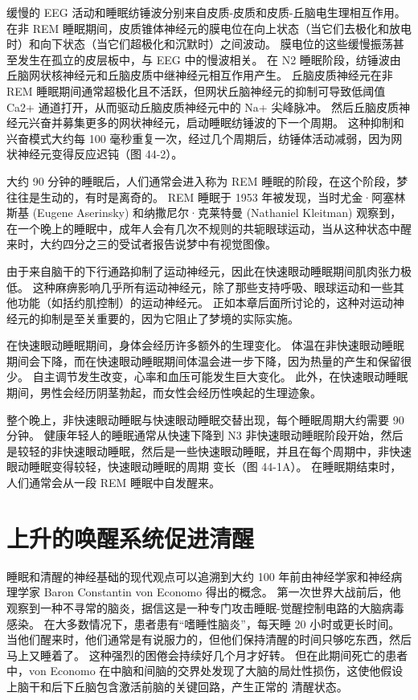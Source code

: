 缓慢的 EEG 活动和睡眠纺锤波分别来自皮质-皮质和皮质-丘脑电生理相互作用。 在非 REM 睡眠期间，皮质锥体神经元的膜电位在向上状态（当它们去极化和放电时）和向下状态（当它们超极化和沉默时）之间波动。 膜电位的这些缓慢振荡甚至发生在孤立的皮层板中，与 EEG 中的慢波相关。 在 N2 睡眠阶段，纺锤波由丘脑网状核神经元和丘脑皮质中继神经元相互作用产生。 丘脑皮质神经元在非 REM 睡眠期间通常超极化且不活跃，但网状丘脑神经元的抑制可导致低阈值 Ca2+ 通道打开，从而驱动丘脑皮质神经元中的 Na+ 尖峰脉冲。 然后丘脑皮质神经元兴奋并募集更多的网状神经元，启动睡眠纺锤波的下一个周期。 这种抑制和兴奋模式大约每 100 毫秒重复一次，经过几个周期后，纺锤体活动减弱，因为网状神经元变得反应迟钝（图 44-2）。

大约 90 分钟的睡眠后，人们通常会进入称为 REM 睡眠的阶段，在这个阶段，梦往往是生动的，有时是离奇的。 REM 睡眠于 1953 年被发现，当时尤金·阿塞林斯基 (Eugene Aserinsky) 和纳撒尼尔·克莱特曼 (Nathaniel Kleitman) 观察到，在一个晚上的睡眠中，成年人会有几次不规则的共轭眼球运动，当从这种状态中醒来时，大约四分之三的受试者报告说梦中有视觉图像。

由于来自脑干的下行通路抑制了运动神经元，因此在快速眼动睡眠期间肌肉张力极低。 这种麻痹影响几乎所有运动神经元，除了那些支持呼吸、眼球运动和一些其他功能（如括约肌控制）的运动神经元。 正如本章后面所讨论的，这种对运动神经元的抑制是至关重要的，因为它阻止了梦境的实际实施。

在快速眼动睡眠期间，身体会经历许多额外的生理变化。 体温在非快速眼动睡眠期间会下降，而在快速眼动睡眠期间体温会进一步下降，因为热量的产生和保留很少。 自主调节发生改变，心率和血压可能发生巨大变化。 此外，在快速眼动睡眠期间，男性会经历阴茎勃起，而女性会经历性唤起的生理迹象。

整个晚上，非快速眼动睡眠与快速眼动睡眠交替出现，每个睡眠周期大约需要 90 分钟。 健康年轻人的睡眠通常从快速下降到 N3 非快速眼动睡眠阶段开始，然后是较轻的非快速眼动睡眠，然后是一些快速眼动睡眠，并且在每个周期中，非快速眼动睡眠变得较轻，快速眼动睡眠的周期 变长（图 44-1A）。 在睡眠期结束时，人们通常会从一段 REM 睡眠中自发醒来。

\section{上升的唤醒系统促进清醒}
睡眠和清醒的神经基础的现代观点可以追溯到大约 100 年前由神经学家和神经病理学家 Baron Constantin von Economo 得出的概念。 第一次世界大战前后，他观察到一种不寻常的脑炎，据信这是一种专门攻击睡眠-觉醒控制电路的大脑病毒感染。 在大多数情况下，患者患有“嗜睡性脑炎”，每天睡 20 小时或更长时间。 当他们醒来时，他们通常是有说服力的，但他们保持清醒的时间只够吃东西，然后马上又睡着了。 这种强烈的困倦会持续好几个月才好转。 但在此期间死亡的患者中，von Economo 在中脑和间脑的交界处发现了大脑的局灶性损伤，这使他假设上脑干和后下丘脑包含激活前脑的关键回路，产生正常的 清醒状态。

